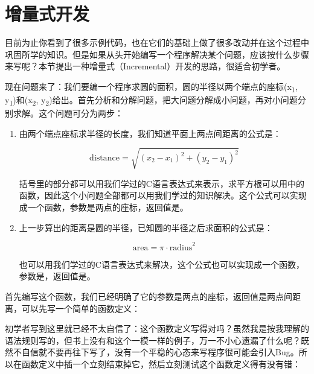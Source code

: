 


\section{增量式开发}
%
目前为止你看到了很多示例代码，也在它们的基础上做了很多改动并在这个过程中巩固所学的知识。但是如果从头开始编写一个程序解决某个问题，应该按什么步骤来写呢？本节提出一种增量式（Incremental）开发的思路，很适合初学者。



现在问题来了：我们要编一个程序求圆的面积，圆的半径以两个端点的座标(x\textsubscript{1}, y\textsubscript{1})和(x\textsubscript{2}, y\textsubscript{2})给出。首先分析和分解问题，把大问题分解成小问题，再对小问题分别求解。这个问题可分为两步：


\begin{enumerate}

\item 由两个端点座标求半径的长度，我们知道平面上两点间距离的公式是：


\[\mathrm{distance}=\sqrt{(x_{2}-x_{1})^{2}+(y_{2}-y_{1})^{2}}\]


括号里的部分都可以用我们学过的C语言表达式来表示，求平方根可以用中的函数，因此这个小问题全部都可以用我们学过的知识解决。这个公式可以实现成一个函数，参数是两点的座标，返回值是。

\item 上一步算出的距离是圆的半径，已知圆的半径之后求面积的公式是：


\[\mathrm{area}=\pi\cdot\mathrm{radius}^{2}\]


也可以用我们学过的C语言表达式来解决，这个公式也可以实现成一个函数，参数是，返回值是。
\end{enumerate}


首先编写这个函数，我们已经明确了它的参数是两点的座标，返回值是两点间距离，可以先写一个简单的函数定义：




初学者写到这里就已经不太自信了：这个函数定义写得对吗？虽然我是按我理解的语法规则写的，但书上没有和这个一模一样的例子，万一不小心遗漏了什么呢？既然不自信就不要再往下写了，没有一个平稳的心态来写程序很可能会引入Bug。所以在函数定义中插一个立刻结束掉它，然后立刻测试这个函数定义得有没有错：


